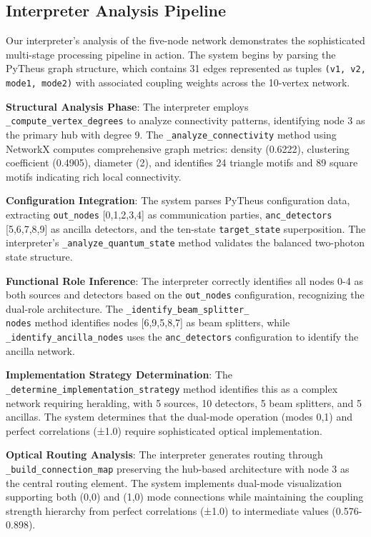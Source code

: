 \documentclass[11pt,a4paper]{article}
\begin{document}
\subsection{Interpreter Analysis Pipeline}

Our interpreter's analysis of the five-node network demonstrates the sophisticated multi-stage processing pipeline in action. The system begins by parsing the PyTheus graph structure, which contains 31 edges represented as tuples \texttt{(v1, v2, mode1, mode2)} with associated coupling weights across the 10-vertex network.

\textbf{Structural Analysis Phase}: The interpreter employs \texttt{\_compute\_vertex\_degrees} to analyze connectivity patterns, identifying node 3 as the primary hub with degree 9. The \texttt{\_analyze\_connectivity} method using NetworkX computes comprehensive graph metrics: density (0.6222), clustering coefficient (0.4905), diameter (2), and identifies 24 triangle motifs and 89 square motifs indicating rich local connectivity.

\textbf{Configuration Integration}: The system parses PyTheus configuration data, extracting \texttt{out\_nodes} [0,1,2,3,4] as communication parties, \texttt{anc\_detectors} [5,6,7,8,9] as ancilla detectors, and the ten-state \texttt{target\_state} superposition. The interpreter's \texttt{\_analyze\_quantum\_state} method validates the balanced two-photon state structure.

\textbf{Functional Role Inference}: The interpreter correctly identifies all nodes 0-4 as both sources and detectors based on the \texttt{out\_nodes} configuration, recognizing the dual-role architecture. The \texttt{\_identify\_beam\_splitter\_\\nodes} method identifies nodes [6,9,5,8,7] as beam splitters, while \texttt{\_identify\_ancilla\_nodes} uses the \texttt{anc\_detectors} configuration to identify the ancilla network.

\textbf{Implementation Strategy Determination}: The \texttt{\_determine\_implementation\_strategy} method identifies this as a complex network requiring heralding, with 5 sources, 10 detectors, 5 beam splitters, and 5 ancillas. The system determines that the dual-mode operation (modes 0,1) and perfect correlations (±1.0) require sophisticated optical implementation.

\textbf{Optical Routing Analysis}: The interpreter generates routing through \texttt{\_build\_connection\_map} preserving the hub-based architecture with node 3 as the central routing element. The system implements dual-mode visualization supporting both (0,0) and (1,0) mode connections while maintaining the coupling strength hierarchy from perfect correlations (±1.0) to intermediate values (0.576-0.898).
\end{document}

